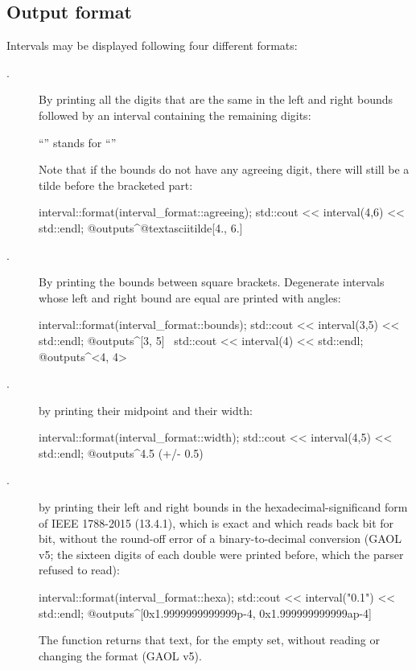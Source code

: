 \documentclass{manual}
\newcommand{\itv}[2]{\ensuremath{[#1,\,#2]}}
\begin{document}
\subsection{Output format}\label{sec:output-format}

Intervals may be displayed following four different formats:
\begin{description}
\item[.] By printing all the digits that are the same in the left and right bounds
followed by an interval containing the remaining digits:
\begin{center}
``\element{3.141\textasciitilde[5926, 6001]}'' stands for
``\element{\itv{3.1415926}{3.1416001}}''
\end{center}
Note that if the bounds do not have any agreeing digit, there will still be a tilde before the bracketed part:
\begin{example}
 interval::format(interval_format::agreeing);
 std::cout << interval(4,6) << std::endl;
 @outputs^@textasciitilde[4., 6.]~
\end{example}

\item[.] By printing the bounds between square brackets.
Degenerate intervals whose left and right bound are equal are printed with angles:
\begin{example}
 interval::format(interval_format::bounds);
 std::cout << interval(3,5) << std::endl;
 @outputs^[3, 5]~
 std::cout << interval(4) << std::endl;
 @outputs^<4, 4>~
\end{example}

\item[.] by printing their midpoint and their width:
\begin{example}
 interval::format(interval_format::width);
 std::cout << interval(4,5) << std::endl;
 @outputs^4.5 (+/- 0.5)~
\end{example}

\item[.] by printing their left and right bounds in the
hexadecimal-significand form of IEEE 1788-2015 (13.4.1), which is exact and which
 reads back bit for bit, without the round-off error of a
binary-to-decimal conversion (GAOL v5; the sixteen digits of each double were printed
before, which the parser refused to read):
\begin{example}
 interval::format(interval_format::hexa);
 std::cout << interval("0.1") << std::endl;
 @outputs^[0x1.9999999999999p-4, 0x1.999999999999ap-4]~
\end{example}
The function  returns that
text, \code{[empty]} for the empty set, without reading or changing the format
(GAOL v5).

\end{description}
\end{document}
